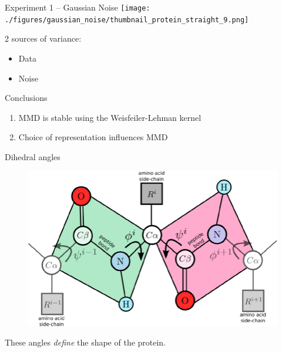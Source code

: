 \documentclass[aspectratio=169, 10pt, dvipsnames]{beamer}
\begin{document}
\begin{frame}[fragile]{Experiment 1 -- Gaussian Noise \texttt{[image: ./figures/gaussian\_noise/thumbnail\_protein\_straight\_9.png]}}
\begin{minipage}{0.38\linewidth}
    \pause\small 2 sources of variance:
    \begin{itemize}
      \pause\small\item Data
      \pause\small\item Noise
  \end{itemize}

  \begin{alert}{Conclusions}
    \begin{enumerate}
      \pause\item MMD is stable using the Weisfeiler-Lehman kernel
      \pause\item Choice of representation influences MMD
    \end{enumerate}
  \end{alert}
  \end{minipage}
\end{frame}


{
  \begin{frame}[fragile]{Dihedral angles}
    \begin{minipage}{0.7\textwidth}
      \begin{figure}
        \centering
        \includegraphics[width=\textwidth]{./figures/phi_psi.png}
      \end{figure}
    \end{minipage}
    \hfill
    \begin{minipage}{0.25\textwidth}
      \small These angles \emph{define} the shape of the protein.
    \end{minipage}
  \end{frame}
}
\end{document}
